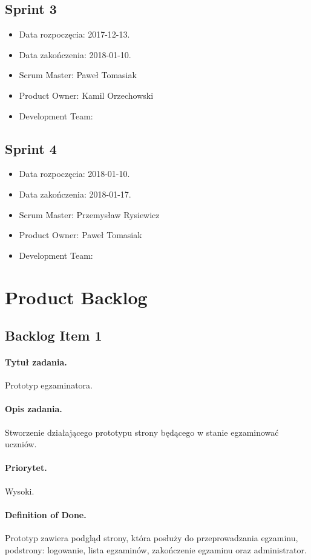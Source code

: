 \documentclass[a4paper]{article}
\begin{document}
\subsection{Sprint 3}

\begin{itemize}
\item Data rozpoczęcia: 2017-12-13.
\item  Data zakończenia: 2018-01-10.
\item Scrum Master: Paweł Tomasiak
\item Product Owner: Kamil Orzechowski
\item Development Team:
\end{itemize}

\subsection{Sprint 4}

\begin{itemize}
\item Data rozpoczęcia: 2018-01-10.
\item  Data zakończenia: 2018-01-17.
\item Scrum Master: Przemysław Rysiewicz
\item Product Owner: Paweł Tomasiak
\item Development Team:
\end{itemize}


\section{Product Backlog}

\subsection{Backlog Item 1}
\paragraph{Tytuł zadania.} Prototyp egzaminatora.
\paragraph{Opis zadania.} Stworzenie działającego prototypu strony będącego w stanie egzaminować uczniów.
\paragraph{Priorytet.} Wysoki.
\paragraph{Definition of Done.} Prototyp zawiera podgląd strony, która posłuży do przeprowadzania egzaminu, podstrony: logowanie, lista egzaminów, zakończenie egzaminu oraz administrator.
\end{document}

